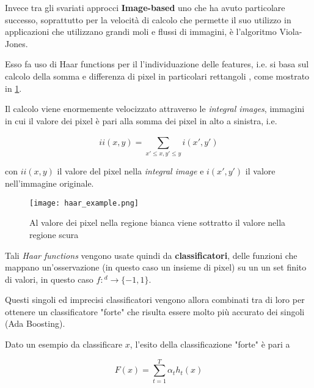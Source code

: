 Invece tra gli svariati approcci \textbf{Image-based} uno che ha avuto particolare successo, soprattutto per la 
velocità di calcolo che permette il suo utilizzo in applicazioni che utilizzano grandi 
moli e flussi di immagini, è l'algoritmo Viola-Jones.

\medskip

Esso fa uso di Haar functions per il l'individuazione delle features, i.e. 
si basa sul calcolo della somma e differenza di pixel in particolari rettangoli 
\cite{Viola2004}, come mostrato in \ref{fig:haar}.

Il calcolo viene enormemente velocizzato attraverso le \textit{integral images}, 
immagini in cui il valore dei pixel è pari alla somma dei pixel in alto a sinistra, i.e.

\begin{equation}
    ii(x,y) = \sum_{x'\leq x, y' \leq y}^{} i(x', y')
    \label{eq:}
\end{equation}

con $ii(x,y)$ il valore del pixel nella \textit{integral image} e $i(x',y')$ 
il valore nell'immagine originale.

\begin{figure}
    \begin{small}
        \begin{center}
            \texttt{[image: haar\_example.png]}
        \end{center}
        \caption{Al valore dei pixel nella regione bianca viene sottratto il valore nella regione scura 
            \cite{Viola2004}}
        \label{fig:haar}
    \end{small}
\end{figure}

\medskip

Tali \textit{Haar functions} vengono usate quindi da \textbf{classificatori}, 
delle funzioni che mappano un'osservazione (in questo caso un insieme di pixel) su un un set finito di valori, 
in questo caso \cite{Wang2014}
$f:$\Rset$^d\rightarrow \{-1, 1\}$.

Questi singoli ed imprecisi classificatori vengono allora combinati tra di loro
per ottenere un classificatore "forte" che risulta essere molto più accurato \cite{Schapire2013} dei singoli (Ada Boosting).

Dato un esempio da classificare $x$, l'esito della classificazione "forte" è pari a 

\begin{equation}
    F(x) = \sum_{t=1}^{T} \alpha_t h_t(x)
    \label{eq:}
\end{equation}

